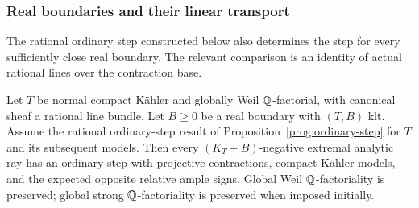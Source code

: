 \subsubsection{Real boundaries and their linear transport}

The rational ordinary step constructed below also determines the step
for every sufficiently close real boundary. The relevant comparison is
an identity of actual rational lines over the contraction base.

\begin{proposition}
\label{prog:ordinary-replacement}
Let $T$ be normal compact K\"ahler and globally Weil $\mathbb Q$-factorial,
with canonical sheaf a rational line bundle. Let $B\geq0$ be a real
boundary with $(T,B)$ klt. Assume the rational ordinary-step result
of Proposition~\ref{prog:ordinary-step} for $T$ and its subsequent models. Then every
$(K_T+B)$-negative extremal analytic ray has an ordinary step with
projective contractions, compact K\"ahler models, and the expected
opposite relative ample signs. Global Weil $\mathbb Q$-factoriality is preserved;
global strong $\mathbb Q$-factoriality is preserved when imposed initially.
\end{proposition}
